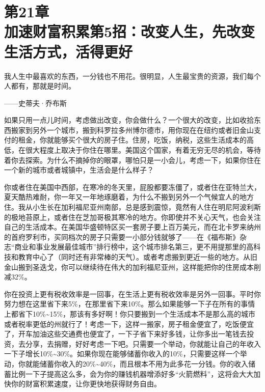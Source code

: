 
\section[第21章\q 加速财富积累第5招：改变人生，先改变生活方式，活得更好]{第21章\\ 加速财富积累第5招：改变人生，先改变生活方式，活得更好}

\begin{BookQuote}
我人生中最喜欢的东西，一分钱也不用花。很明显，人生最宝贵的资源，我们每个人都有，那就是时间。

\hfill ——史蒂夫·乔布斯
\end{BookQuote}

如果只用一点儿时间，考虑做出改变，你会做什么？一个很大的改变，比如收拾东西搬家到另外一个城市，搬到科罗拉多州博尔德市，用你现在在纽约或者旧金山支付的租金，你就能够买个很大的房子住。住房，吃饭，纳税，这些生活成本的高低，在很大程度上取决于你住在哪里。美国这个国家，有着无穷无尽的机会，等待着你去探索。为什么不摘掉你的眼罩，哪怕只是一小会儿，考虑一下，如果你住在一个新的城市或者城镇中，生活会是什么样子？

你或者住在美国中西部，在寒冷的冬天里，屁股都要冻僵了，或者住在亚特兰大，夏天酷热难耐，你一年又一年地琢磨着，为什么不搬到另外一个气候宜人的地方住。我从小生长在加利福尼亚州南部，总是感到震惊，竟然有人住在明尼阿波利斯的极地苔原上，或者住在芝加哥极其寒冷的地方。你即使并不关心天气，也会关注自己的生活成本。在美国华盛顿特区买一套房子要上百万美元，而在北卡罗来纳州的首府罗利市，买同档次的房子只需要一小部分钱就够了——在《福布斯》杂志“商业和事业发展最佳城市”排行榜中，这个城市排名第三，更不用提那里的高科技和教育中心了（同时还有非常棒的天气）。或者考虑搬到更近一些的地方。从旧金山搬到圣迭戈，你可以继续待在伟大的加利福尼亚州，这样能把你的住房成本削减32\%。

你在投资上更有税收效率是一回事，在生活上更有税收效率是另外一回事。平时你努力想在这里省下来5\%，在那里省下来10\%。那么如果能够一下子在所有的事情上都省下10\%\textasciitilde{}15\%，那该有多好啊！你只要搬到一个生活成本不是那么高的城市或者税率更低的州就行了！考虑一下，这样一搬家，房子租金便宜了，吃饭便宜了，开车加油这些交通费也便宜了，一下子省下来好多钱，让你多出一笔钱去投资，去分享，去捐赠，好好考虑一下吧。只需要一个举动，你就能让自己的年收入一下子增长10\%\textasciitilde{}30\%。如果你现在能够储蓄你收入的10\%，只需要这样一个举动，你就能储蓄你收入的20\%\textasciitilde{}40\%，而且根本不用为此多花一分钱。你的收入储蓄比例一下子提高这么多，会为你的赚钱机器增添好多“火箭燃料”，这将会大大加快你的财富积累速度，让你更快地获得财务自由。

